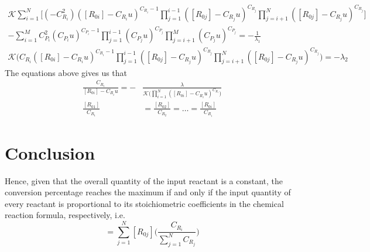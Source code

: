 \documentclass{article}
\begin{document}
\begin{equation}
\begin{aligned}
    \mathscr{K} \sum_{i=1} ^ N\bigg[ (-C_{R_i}^2 ) ([R_{0i}] - C_{R_i}u)^{C_{R_i} - 1} \prod_{j=1}^{i-1} ([R_{0j}] - C_{R_j} u)^{C_{R_j}} \prod_{j=i+1}^{N} ([R_{0j}] - C_{R_j}u)^{C_{R_j}} \bigg] \\ 
    - \sum_{i=1}^{M} C_{P_i}^2 (C_{P_i}u)^{C_{P_i} - 1} \prod_{j=1}^{i-1} (C_{P_j}u)^{C_{P_j}} \prod_{j=i+1}^{M} (C_{P_j} u )^{C_{P_j}} = -\frac{1}{\lambda_1} \\
    \mathscr{K} \bigg( C_{R_i} ([R_{0i}] - C_{R_i}u)^{C_{R_i}-1} \prod^{i-1}_{j=1} ([R_{0j}] - C_{R_j}u)^{C_{R_j}} \prod_{j=i+1}^{N} ([R_{0j}] - C_{R_j}u)^{C_{R_j}} \bigg)  = -\lambda_2
\end{aligned}
\end{equation}
The equations above gives us that 
\begin{equation}
\begin{aligned}
    \frac{C_{R_i}}{[R_{0i}] - C_{R_i}u} = -&\frac{\lambda} {\mathscr{K}\bigg(\prod^{N}_{i=1}([R_{0i}]-C_{R_i}u)^{C_{R_i}}\bigg)}  \\
    \frac{[R_{01}]}{C_{R_1}} &= \frac{[R_{02}]}{C_{R_2}} = \dots = \frac{[R_{0i}]}{C_{R_i}}
\end{aligned}
\end{equation}
\section{Conclusion}
\indent Hence, given that the overall quantity of the input reactant is a constant, the conversion percentage reaches the maximum if and only if the input quantity of every reactant is proportional to its stoichiometric coefficients in the chemical reaction formula, respectively, i.e.
\begin{equation}
    [R_{0i}] = \sum_{j=1}^N [R_{0j}] \bigg( \frac{C_{R_i}}{\sum_{j=1}^N C_{R_j}} \bigg)
\end{equation}
\end{document}
